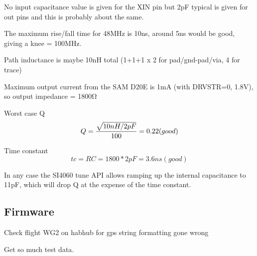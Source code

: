 \documentclass[12pt]{article}
\begin{document}
No input capacitance value is given for the XIN pin but 2pF typical is
given for out pins and this is probably about the same.

The maximum rise/fall time for 48MHz is 10ns, around 5ns would be
good, giving a knee = 100MHz.

Path inductance is maybe 10nH total (1+1+1 x 2 for pad/gnd-pad/via, 4
for trace)

Maximum output current from the SAM D20E is 1mA (with DRVSTR=0, 1.8V),
so output impedance = 1800Ω

Worst case Q
\begin{equation}
  Q = {\sqrt{10nH/2pF} \over 100} = 0.22 (good)
\end{equation}

Time constant
\begin{equation}
  tc = RC = 1800*2pF = 3.6ns (good)
\end{equation}

In any case the SI4060 tune API allows ramping up the internal
capacitance to 11pF, which will drop Q at the expense of the time
constant.

\subsection {Firmware}

Check flight WG2 on habhub for gps string formatting gone wrong

Get so much test data.
\end{document}

